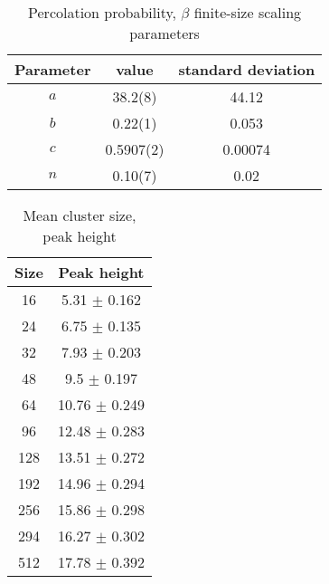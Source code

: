 \begin{table}[H]
\begin{center}
    \begin{tabular}{||c | c c|| }
    \hline
      Parameter &  value & standard deviation \\
    \hline
      $a$ &    38.2(8)  &  44.12 \\
      $b$ &    0.22(1) &  0.053 \\
      $c$ & 0.5907(2) & 0.00074 \\
      $n$ & 0.10(7) & 0.02 \\
    \hline
    \end{tabular}
\end{center}
\caption{Percolation probability, $\beta$ finite-size scaling parameters}
\label{table:pp_center_finite_size_scaling_params}
\end{table}






\begin{table}[H]
\begin{center}
    \begin{tabular}{||c | c|| }
    \hline
       Size & Peak height     \\
    \hline
         16 & 5.31 $\pm$ 0.162  \\
         24 & 6.75 $\pm$ 0.135  \\
         32 & 7.93 $\pm$ 0.203  \\
         48 & 9.5 $\pm$ 0.197   \\
         64 & 10.76 $\pm$ 0.249 \\
         96 & 12.48 $\pm$ 0.283 \\
        128 & 13.51 $\pm$ 0.272 \\
        192 & 14.96 $\pm$ 0.294 \\
        256 & 15.86 $\pm$ 0.298 \\
        294 & 16.27 $\pm$ 0.302 \\
        512 & 17.78 $\pm$ 0.392 \\
    \hline
    \end{tabular}
\end{center}
\caption{Mean cluster size, peak height}
\label{table:pp_mean_cluster_size_peak_values}
\end{table}



